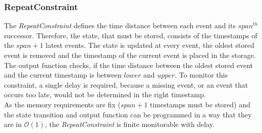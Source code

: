 \subsubsection{RepeatConstraint}
	The \emph{RepeatConstraint} defines the time distance between each event and its $span^{th}$ successor. Therefore, the state, that must be stored, consists of the timestamps of the $span+1$ latest events. The state is updated at every event, the oldest stored event is removed and the timestamp of the current event is placed in the storage. The output function checks, if the time distance between the oldest stored event and the current timestamp is between $lower$ and $upper$. To monitor this constraint, a single delay is required, because a missing event, or an event that occurs too late, would not be determined in the right timestamp.\\
	As the memory requirements are fix ($span+1$ timestamps must be stored) and the state transition and output function can be programmed in a way that they are in  $\mathcal O(1)$, the \emph{RepeatConstraint} is finite monitorable with delay.

